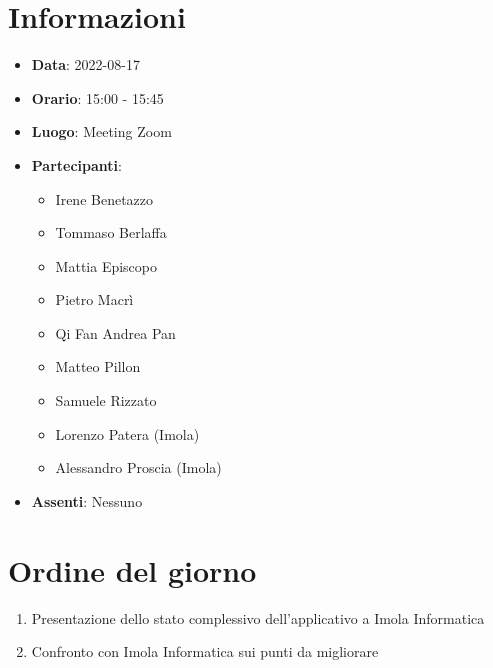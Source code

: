 \section{Informazioni}
	\begin{itemize}
		\item \textbf{Data}: 2022-08-17     %
		\item \textbf{Orario}: 15:00 - 15:45     %
		\item \textbf{Luogo}: Meeting Zoom
		\item \textbf{Partecipanti}:
		\begin{itemize}
			\item Irene Benetazzo
			\item Tommaso Berlaffa
			\item Mattia Episcopo
			\item Pietro Macrì
			\item Qi Fan Andrea Pan
			\item Matteo Pillon
			\item Samuele Rizzato
			\item Lorenzo Patera (Imola)
			\item Alessandro Proscia (Imola)
		\end{itemize}
        \item \textbf{Assenti}: Nessuno
	\end{itemize}
    
	\section{Ordine del giorno}
	\begin{enumerate}
		\item Presentazione dello stato complessivo dell'applicativo a Imola Informatica
		\item Confronto con Imola Informatica sui punti da migliorare
	\end{enumerate}
	\newpage